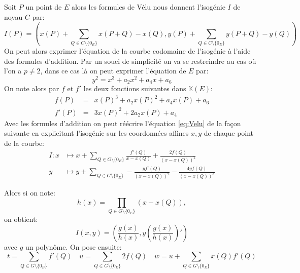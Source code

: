 \documentclass[10pt,a4paper]{book}
\theoremstyle{plain}
\theoremstyle{definition}
\theoremstyle{definition}
\theoremstyle{definition}
\theoremstyle{definition}
\theoremstyle{remark}
\theoremstyle{remark}
\theoremstyle{definition}
\begin{document}
Soit $P$ un point de $E$ alors les formules de Vélu nous donnent l'isogénie $I$ de noyau $C$ par: 
\begin{equation}
\label{eq:Velu}
I(P)= \left( x(P)+\sum_{Q \in C \setminus \{0_E\}} x(P+Q)-x(Q),y(P)+\sum_{Q \in C \setminus \{0_E\}} y(P+Q)-y(Q) \right)
\end{equation} 
On peut alors exprimer l'équation de la courbe codomaine de l'isogénie à l'aide des formules d'addition. Par un souci de simplicité on va se restreindre au cas où l'on a $p \neq 2$, dans ce cas là on peut exprimer l'équation de $E$ par:
\begin{equation*}
y^2=x^3+a_2 x^2 + a_4 x + a_6
\end{equation*}
On note alors par $f$ et $f'$ les deux fonctions suivantes dans $\mathbb{K}(E)$:
\begin{align*}
f(P)&=& x(P)^3+a_2x(P)^2+a_4x(P)+a_6 \\
f'(P)&=& 3x(P)^2+2a_2x(P)+a_4
\end{align*}
Avec les formules d'addition on peut réécrire l'équation \eqref{eq:Velu} de la façon suivante en explicitant l'isogénie sur les coordonnées affines $x,y$ de chaque point de la courbe:
\begin{equation} 
\begin{alignedat}{1}
I:x & \mapsto  x + \sum_{Q \in G \setminus \{0_E\}} \frac{f'(Q)}{x-x(Q)}+\frac{2f(Q)}{(x-x(Q))^2} \\
 y & \mapsto y + \sum_{Q \in G \setminus \{0_E\}} -\frac{yf'(Q)}{(x-x(Q))^2}-\frac{4yf(Q)}{(x-x(Q))^3}  
\end{alignedat}
\label{eq:velu:sum}
\end{equation}

Alors si on note: 
\begin{equation*}
h(x)=\prod_{Q \in G \setminus \{0_E\}}(x-x(Q)),
\end{equation*}
on obtient:
\begin{equation} 
\label{eq:velu:gh}
I(x,y)=\left(\frac{g(x)}{h(x)},y\left( \frac{g(x)}{h(x)} \right)'\right)
\end{equation}
avec $g$ un polynôme. On pose ensuite:
\begin{equation*}
t= \sum_{Q \in G \setminus \{0_E\}} f'(Q) \quad u=\sum_{Q \in G \setminus \{0_E\}} 2f(Q) \quad w=u+\sum_{Q \in G \setminus \{0_E\}}x(Q)f'(Q) 
\end{equation*}
\end{document}
